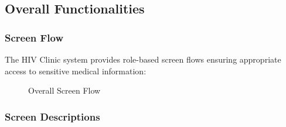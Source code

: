 \documentclass[12pt,a4paper]{article}
\begin{document}
\subsection{Overall Functionalities}

\subsubsection{Screen Flow}

The HIV Clinic system provides role-based screen flows ensuring appropriate access to sensitive medical information:

\begin{figure}[H]
    \centering
    \caption{Overall Screen Flow}
    \label{fig:screen-flow}
\end{figure}

\subsubsection{Screen Descriptions}
\end{document}
